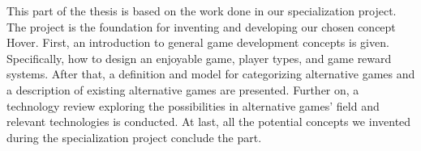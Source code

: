 This part of the thesis is based on the work done in our specialization project. The project is the foundation for inventing and developing our chosen concept Hover. First, an introduction to general game development concepts is given. Specifically, how to design an enjoyable game, player types, and game reward systems. After that, a definition and model for categorizing alternative games and a description of existing alternative games are presented. Further on, a technology review exploring the possibilities in alternative games’ field and relevant technologies is conducted. At last, all the potential concepts we invented during the specialization project conclude the part.

















